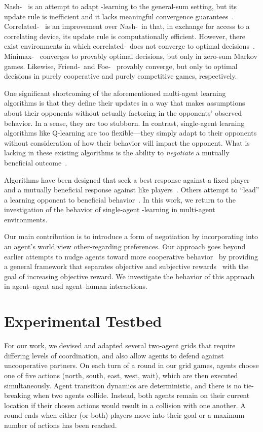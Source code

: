 \documentclass[letterpaper]{article}
\begin{document}
Nash-\Q~\cite{hu03} is an attempt to adapt \Q-learning to the
general-sum setting, but its update rule is inefficient and it lacks
meaningful convergence guarantees~\cite{bowling00,littman01d}.
Correlated-\Q~\cite{greenwald03} is an improvement over Nash-\Q\ in
that, in exchange for access to a correlating device, its update rule
is computationally efficient.  However, there exist environments in
which correlated-\Q\ does not converge to optimal
decisions~\cite{zinkevich05}.  Minimax-\Q~\cite{littman94b} converges
to provably optimal decisions, but only in zero-sum Markov games.
Likewise, Friend-\Q\ and Foe-\Q~\cite{littman01d} provably converge,
but only to optimal decisions in purely cooperative and purely
competitive games, respectively.

One significant shortcoming of the aforementioned multi-agent learning
algorithms is that they define their updates in a way that makes
assumptions about their opponents without actually factoring in the
opponents' observed behavior. In a sense, they are too stubborn. In
contrast, single-agent learning algorithms like Q-learning are too
flexible---they simply adapt to their opponents without consideration
of how their behavior will impact the opponent. What is lacking in
these existing algorithms is the ability to \emph{negotiate} a
mutually beneficial outcome~\cite{gal04}.

Algorithms have been designed that seek a best response against a
fixed player and a mutually beneficial response against like
players~\cite{conitzer07,bowling02}. Others attempt to ``lead'' a
learning opponent to beneficial behavior~\cite{littman01h}. In this
work, we return to the investigation of the behavior of
single-agent \Q-learning in multi-agent environments.

Our main contribution is to introduce a form of negotiation by
incorporating into an agent's world view other-regarding preferences.
Our approach goes beyond earlier attempts to nudge agents toward more
cooperative behavior~\cite{babes08} by providing a general framework
that separates objective and subjective rewards~\cite{singh10} with
the goal of increasing objective reward. We investigate the behavior
of this approach in agent--agent and agent--human interactions.

\section{Experimental Testbed}

For our work, we devised and adapted several two-agent grids that
require differing levels of coordination, and also allow agents to
defend against uncooperative partners. On each turn of a round in our grid games, agents choose one of five actions (north, south, east, west, wait), which are then
executed simultaneously. Agent transition dynamics are deterministic,
and there is no tie-breaking when two agents collide. Instead, both
agents remain on their current location if their chosen actions would
result in a collision with one another. A round ends when either (or both) players move into their goal or a maximum number of actions has been reached.
\end{document}
